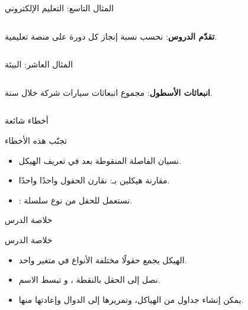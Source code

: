 \documentclass[aspectratio=169, 11pt, t, xcolor={table}]{beamer}
\begin{document}
\begin{frame}[t]{المثال التاسع: التعليم الإلكتروني}
    \begin{columns}[T]
        {\small \textbf{تقدّم الدروس}: نحسب نسبة إنجاز كل دورة على منصة تعليمية.\par}
        \vspace{0.3cm}
    \end{columns}
\end{frame}

\begin{frame}[t]{المثال العاشر: البيئة}
    \begin{columns}[T]
        {\small \textbf{انبعاثات الأسطول}: مجموع انبعاثات سيارات شركة خلال سنة.\par}
        \vspace{0.3cm}
    \end{columns}
\end{frame}

\begin{frame}{أخطاء شائعة}
    \begin{obox}{\faExclamationTriangle\quad تجنّب هذه الأخطاء}
        \begin{itemize}
            \item نسيان الفاصلة المنقوطة بعد \code{\}} في تعريف الهيكل.
            \item مقارنة هيكلين بـ\code{==}: نقارن الحقول واحدًا واحدًا.
            \item {}: نستعمل  للحقل من نوع سلسلة.
        \end{itemize}
    \end{obox}
\end{frame}

\begin{frame}{خلاصة الدرس}
    \begin{tbox}{\faCheckCircle\quad خلاصة الدرس}
        \begin{itemize}
            \item الهيكل يجمع حقولًا مختلفة الأنواع في متغير واحد.
            \item نصل إلى الحقل بالنقطة ، و تبسط الاسم.
            \item يمكن إنشاء جداول من الهياكل، وتمريرها إلى الدوال وإعادتها منها.
        \end{itemize}
    \end{tbox}
\end{frame}
\end{document}
